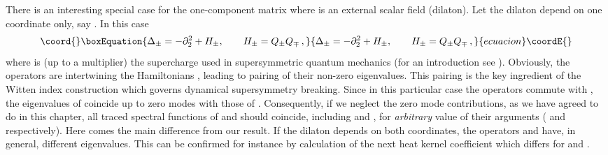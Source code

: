 \documentclass[a4paper,12pt]{article}
\begin{document}
There is an interesting special case 
for the one-component matrix \coordHE{} where
\myHighlight{$\phi$}\coordHE{} is an external scalar field (dilaton). Let the
dilaton depend on one coordinate only, say \coordHE{}.
In this case 
\begin{equation}\coord{}\boxEquation{
\Delta_\pm =-\partial_2^2 +H_\pm ,\qquad
H_\pm =Q_\pm Q_\mp \,,{}  \label{sups}
}{
\Delta_\pm =-\partial_2^2 +H_\pm ,\qquad
H_\pm =Q_\pm Q_\mp \,,{}  }{ecuacion}\coordE{}\end{equation}
where \coordHE{} is
(up to a multiplier) the supercharge used in supersymmetric
quantum mechanics (for an introduction see \cite{Schwabl}).
Obviously, the operators \coordHE{} are intertwining
the Hamiltonians \coordHE{}, leading to pairing of their
non-zero eigenvalues. This pairing is the key ingredient
of the Witten index construction \cite{Witten82} which
governs dynamical supersymmetry breaking. Since in this
particular case the operators \coordHE{} commute with \coordHE{},
the eigenvalues of \myHighlight{$\Delta_\pm$}\coordHE{} coincide up to zero modes with those
of \coordHE{}. Consequently, if we neglect the zero mode
contributions, as we have agreed to do in this chapter,
all traced spectral functions of \myHighlight{$\Delta_+$}\coordHE{} and \myHighlight{$\Delta_-$}\coordHE{}
should coincide, including \coordHE{} 
and \coordHE{}, for {\it arbitrary} value
of their arguments (\coordHE{} and \coordHE{} respectively).
Here comes the main difference from our result. 
If the dilaton \myHighlight{$\phi$}\coordHE{} depends on both coordinates,
the operators \myHighlight{$\Delta_-$}\coordHE{} and \myHighlight{$\Delta_+$}\coordHE{} have, in
general, different eigenvalues. This can be confirmed
for instance by calculation of the next heat kernel
coefficient \coordHE{} which differs for
\myHighlight{$\Delta_+$}\coordHE{} and \myHighlight{$\Delta_-$}\coordHE{}. 



\end{document}
